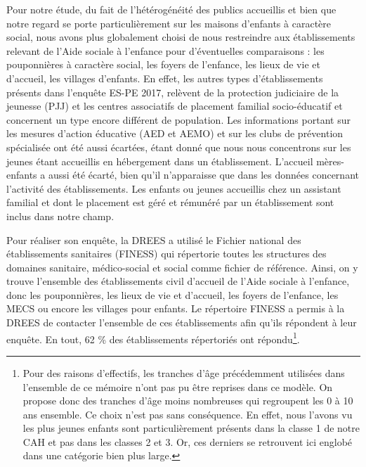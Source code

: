 \documentclass[
  12,
  a4paper,
]{report}
\begin{document}
\begin{mdframed}[frametitle=Le champ retenu pour notre étude]

Pour notre étude, du fait de l’hétérogénéité des publics accueillis et bien que notre regard se porte particulièrement sur les maisons d’enfants à caractère social, nous avons plus globalement choisi de nous restreindre aux établissements relevant de l’Aide sociale à l’enfance pour d’éventuelles comparaisons : les pouponnières à caractère social, les foyers de l’enfance, les lieux de vie et d’accueil, les villages d’enfants. En effet, les autres types d’établissements présents dans l’enquête ES-PE 2017, relèvent de la protection judiciaire de la jeunesse (PJJ) et les centres associatifs de placement familial socio-éducatif et concernent un type encore différent de population. Les informations portant sur les mesures d’action éducative (AED et AEMO) et sur les clubs de prévention spécialisée ont été aussi écartées, étant donné que nous nous concentrons sur les jeunes étant accueillis en hébergement dans un établissement. L’accueil mères-enfants a aussi été écarté, bien qu’il n’apparaisse que dans les données concernant l’activité des établissements. Les enfants ou jeunes accueillis chez un assistant familial et dont le placement est géré et rémunéré par un établissement sont inclus dans notre champ. 

\end{mdframed}

Pour réaliser son enquête, la DREES a utilisé le Fichier national des
établissements sanitaires (FINESS) qui répertorie toutes les structures
des domaines sanitaire, médico-social et social comme fichier de
référence. Ainsi, on y trouve l'ensemble des établissements civil
d'accueil de l'Aide sociale à l'enfance, donc les pouponnières, les
lieux de vie et d'accueil, les foyers de l'enfance, les MECS ou encore
les villages pour enfants. Le répertoire FINESS a permis à la DREES de
contacter l'ensemble de ces établissements afin qu'ils répondent à leur
enquête. En tout, 62 \% des établissements répertoriés ont
répondu\footnote{Pour des raisons d'effectifs, les tranches d'âge
  précédemment utilisées dans l'ensemble de ce mémoire n'ont pas pu être
  reprises dans ce modèle. On propose donc des tranches d'âge moins
  nombreuses qui regroupent les 0 à 10 ans ensemble. Ce choix n'est pas
  sans conséquence. En effet, nous l'avons vu les plus jeunes enfants
  sont particulièrement présents dans la classe 1 de notre CAH et pas
  dans les classes 2 et 3. Or, ces derniers se retrouvent ici englobé
  dans une catégorie bien plus large.}.
\end{document}
